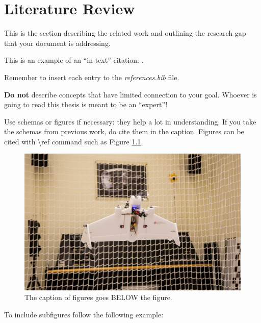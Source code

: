 \chapter{Literature Review}
\label{chap::literature_review}

This is the section describing the related work and outlining the research gap that your document is addressing.

This is an example of an ``in-text'' citation: \cite{jordan2015machine}.

Remember to insert each entry to the \textit{references.bib} file.

\textbf{Do not} describe concepts that have limited connection to your goal. Whoever is going to read this thesis is meant to be an ``expert''!

Use schemas or figures if necessary: they help a lot in understanding. If you take the schemas from previous work, do cite them in the caption. Figures can be cited with \textbackslash ref command such as Figure \ref{fig::example_picture}.

\begin{figure}[!htbp]
    \centering
    \includegraphics[width=0.75\columnwidth]{images/figures/example_figure.jpg}
    \caption{The caption of figures goes BELOW the figure.}
    \label{fig::example_picture}
\end{figure}

To include subfigures follow the following example:

